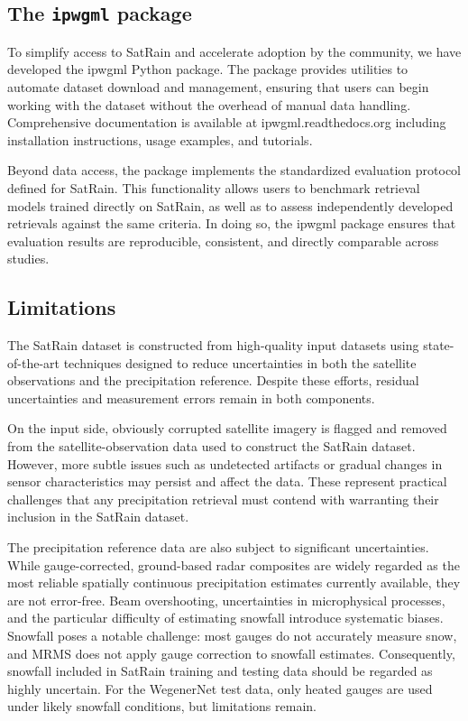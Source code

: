 \documentclass[11pt]{article}
\begin{document}
\subsection{The \texttt{ipwgml} package}

To simplify access to SatRain and accelerate adoption by the community, we have
developed the ipwgml Python package. The package provides utilities to automate
dataset download and management, ensuring that users can begin working with the
dataset without the overhead of manual data handling. Comprehensive
documentation is available at ipwgml.readthedocs.org including installation
instructions, usage examples, and tutorials.

Beyond data access, the package implements the standardized evaluation protocol
defined for SatRain. This functionality allows users to benchmark retrieval
models trained directly on SatRain, as well as to assess independently developed
retrievals against the same criteria. In doing so, the ipwgml package ensures
that evaluation results are reproducible, consistent, and directly comparable
across studies.

\subsection{Limitations}

The SatRain dataset is constructed from high-quality input datasets using
state-of-the-art techniques designed to reduce uncertainties in both the
satellite observations and the precipitation reference. Despite these efforts,
residual uncertainties and measurement errors remain in both components.

On the input side, obviously corrupted satellite imagery is flagged and removed
from the satellite-observation data used to construct the SatRain dataset.
However, more subtle issues such as undetected artifacts or gradual changes in
sensor characteristics may persist and affect the data. These represent
practical challenges that any precipitation retrieval must contend with
warranting their inclusion in the SatRain dataset.

The precipitation reference data are also subject to significant uncertainties.
While gauge-corrected, ground-based radar composites are widely regarded as the
most reliable spatially continuous precipitation estimates currently available,
they are not error-free. Beam overshooting, uncertainties in microphysical
processes, and the particular difficulty of estimating snowfall introduce
systematic biases. Snowfall poses a notable challenge: most gauges do not
accurately measure snow, and MRMS does not apply gauge correction to snowfall
estimates. Consequently, snowfall included in SatRain training and testing data
should be regarded as highly uncertain. For the WegenerNet test data, only
heated gauges are used under likely snowfall conditions, but limitations remain.
\end{document}
